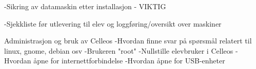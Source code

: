 -Sikring av datamaskin etter installasjon - VIKTIG

-Sjekkliste før utlevering til elev og loggføring/oversikt over maskiner

Administrasjon og bruk av Celleos
-Hvordan finne svar på spørsmål relatert til linux, gnome, debian osv
-Brukeren "root"
-Nullstille elevbruker i Celleos
-Hvordan åpne for internettforbindelse
-Hvordan åpne for USB-enheter

\vfill\eject\bye
